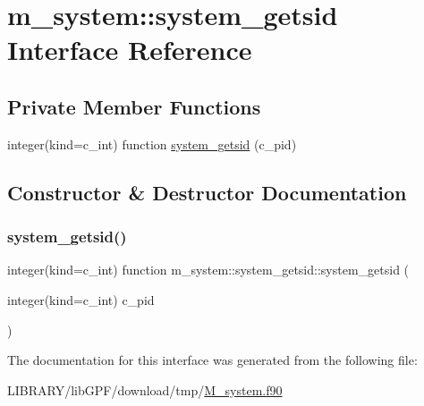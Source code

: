 \hypertarget{interfacem__system_1_1system__getsid}{}\section{m\+\_\+system\+:\+:system\+\_\+getsid Interface Reference}
\label{interfacem__system_1_1system__getsid}
\subsection*{Private Member Functions}
\begin{DoxyCompactItemize}
\item 
integer(kind=c\+\_\+int) function \hyperlink{interfacem__system_1_1system__getsid_a0a665987d35f0b81a2358df6c0173122}{system\+\_\+getsid} (c\+\_\+pid)
\end{DoxyCompactItemize}


\subsection{Constructor \& Destructor Documentation}
\mbox{\label{interfacem__system_1_1system__getsid_a0a665987d35f0b81a2358df6c0173122}} 
\subsubsection{\texorpdfstring{system\+\_\+getsid()}{system\_getsid()}}
{\footnotesize\ttfamily integer(kind=c\+\_\+int) function m\+\_\+system\+::system\+\_\+getsid\+::system\+\_\+getsid (\begin{DoxyParamCaption}\item[{integer(kind=c\+\_\+int)}]{c\+\_\+pid }\end{DoxyParamCaption})\hspace{0.3cm}{\ttfamily [private]}}



The documentation for this interface was generated from the following file\+:\begin{DoxyCompactItemize}
\item 
L\+I\+B\+R\+A\+R\+Y/lib\+G\+P\+F/download/tmp/\hyperlink{M__system_8f90}{M\+\_\+system.\+f90}\end{DoxyCompactItemize}
